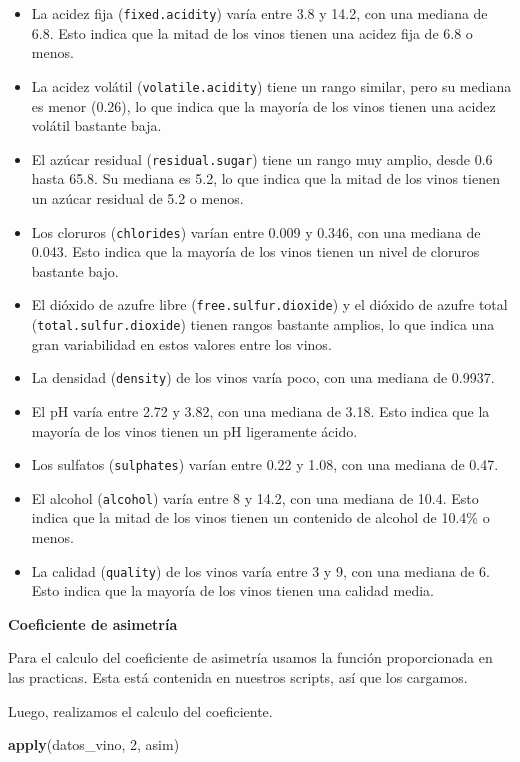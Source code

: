 \documentclass[
]{article}
\newenvironment{Shaded}{\begin{snugshade}}{\end{snugshade}}
\newcommand{\DecValTok}[1]{\textcolor[rgb]{0.00,0.00,0.81}{#1}}
\newcommand{\FunctionTok}[1]{\textcolor[rgb]{0.13,0.29,0.53}{\textbf{#1}}}
\newcommand{\NormalTok}[1]{#1}
\begin{document}
\begin{itemize}
\item
  La acidez fija (\texttt{fixed.acidity}) varía entre 3.8 y 14.2, con
  una mediana de 6.8. Esto indica que la mitad de los vinos tienen una
  acidez fija de 6.8 o menos.
\item
  La acidez volátil (\texttt{volatile.acidity}) tiene un rango similar,
  pero su mediana es menor (0.26), lo que indica que la mayoría de los
  vinos tienen una acidez volátil bastante baja.
\item
  El azúcar residual (\texttt{residual.sugar}) tiene un rango muy
  amplio, desde 0.6 hasta 65.8. Su mediana es 5.2, lo que indica que la
  mitad de los vinos tienen un azúcar residual de 5.2 o menos.
\item
  Los cloruros (\texttt{chlorides}) varían entre 0.009 y 0.346, con una
  mediana de 0.043. Esto indica que la mayoría de los vinos tienen un
  nivel de cloruros bastante bajo.
\item
  El dióxido de azufre libre (\texttt{free.sulfur.dioxide}) y el dióxido
  de azufre total (\texttt{total.sulfur.dioxide}) tienen rangos bastante
  amplios, lo que indica una gran variabilidad en estos valores entre
  los vinos.
\item
  La densidad (\texttt{density}) de los vinos varía poco, con una
  mediana de 0.9937.
\item
  El pH varía entre 2.72 y 3.82, con una mediana de 3.18. Esto indica
  que la mayoría de los vinos tienen un pH ligeramente ácido.
\item
  Los sulfatos (\texttt{sulphates}) varían entre 0.22 y 1.08, con una
  mediana de 0.47.
\item
  El alcohol (\texttt{alcohol}) varía entre 8 y 14.2, con una mediana de
  10.4. Esto indica que la mitad de los vinos tienen un contenido de
  alcohol de 10.4\% o menos.
\item
  La calidad (\texttt{quality}) de los vinos varía entre 3 y 9, con una
  mediana de 6. Esto indica que la mayoría de los vinos tienen una
  calidad media.
\end{itemize}

\textbf{Coeficiente de asimetría}

Para el calculo del coeficiente de asimetría usamos la función
proporcionada en las practicas. Esta está contenida en nuestros scripts,
así que los cargamos.

Luego, realizamos el calculo del coeficiente.

\begin{Shaded}
\begin{Highlighting}[]
\FunctionTok{apply}\NormalTok{(datos\_vino, }\DecValTok{2}\NormalTok{, asim)}
\end{Highlighting}
\end{Shaded}
\end{document}
